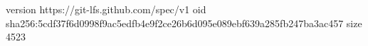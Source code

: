 version https://git-lfs.github.com/spec/v1
oid sha256:5cdf37f6d0998f9ac5edfb4e9f2ce26b6d095e089ebf639a285fb247ba3ac457
size 4523
